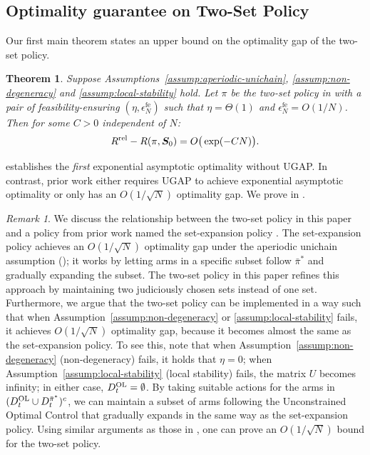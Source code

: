 \documentclass[11pt,letterpaper]{article}
\theoremstyle{plain}
\newtheorem{theorem}{Theorem}
\theoremstyle{definition}
\theoremstyle{remark}
\newtheorem{remark}{\textit{Remark}}
\newcommand{\ve}[1]{\bm{#1}}
\newcommand{\veS}{\ve{S}}
\newcommand{\rel}{\textup{rel}} %
\newcommand{\ravg}{R}
\newcommand{\rsysn}{\ravg(\pi, \veS_0)}
\newcommand{\rrel}{\ravg^\rel}
\newcommand{\pibar}{{\sysbar{\pi}}}
\newcommand{\pibs}{{\pibar^*}}
\newcommand{\sysbar}[1]{\bar{#1}}
\newcommand{\errfe}{\epsilon_N^{\text{fe}}}
\newcommand{\Da}{D^{\pibs}}
\newcommand{\Db}{D^{\textup{OL}}}
\begin{document}
\subsection{Optimality guarantee on Two-Set Policy}\label{sec:results-policy-and-opt-gap}

Our first main theorem states an upper bound on the optimality gap of the two-set policy. 
\begin{theorem}\label{thm:two-set:achievability}
    Suppose Assumptions~\ref{assump:aperiodic-unichain}, \ref{assump:non-degeneracy} and \ref{assump:local-stability} hold. Let $\pi$ be the two-set policy in  with a pair of feasibility-ensuring $(\eta, \errfe)$ such that $\eta=\Theta(1)$ and $\errfe=O(1/N)$. Then for some $C > 0$ independent of $N$:
    \begin{equation}
        \rrel - \rsysn = O\big(\exp(-CN)\big).
    \end{equation}
\end{theorem}

 establishes the \emph{first} exponential asymptotic optimality without UGAP. 
In contrast, prior work either requires UGAP to achieve exponential asymptotic optimality or only has an $O(1/\sqrt{N})$ optimality gap. 
We prove  in . 


\begin{remark}\label{remark:two-set-one-set}
We discuss the relationship between the two-set policy in this paper and a policy from prior work named the set-expansion policy \citep{HonXieCheWan_24}. The set-expansion policy achieves an $O(1/\sqrt{N})$ optimality gap under the aperiodic unichain assumption (); it works by letting arms in a specific subset follow $\pibs$ and gradually expanding the subset. 
The two-set policy in this paper refines this approach by maintaining two judiciously chosen sets instead of one set. 
Furthermore, we argue that the two-set policy can be implemented in a way such that when Assumption~\ref{assump:non-degeneracy} or \ref{assump:local-stability} fails, it achieves $O(1/\sqrt{N})$ optimality gap, because it becomes almost the same as the set-expansion policy. 
To see this, note that when Assumption~\ref{assump:non-degeneracy} (non-degeneracy) fails, it holds that $\eta = 0$; when Assumption~\ref{assump:local-stability} (local stability) fails, the matrix $U$ becomes infinity; in either case, $\Db_t = \emptyset$. 
By taking suitable actions for the arms in $(\Db_t\cup\Da_t)^c$, we can maintain a subset of arms following the Unconstrained Optimal Control that gradually expands in the same way as the set-expansion policy. 
Using similar arguments as those in \cite{HonXieCheWan_24}, one can prove an $O(1/\sqrt{N})$ bound for the two-set policy. 
\end{remark}
\end{document}
